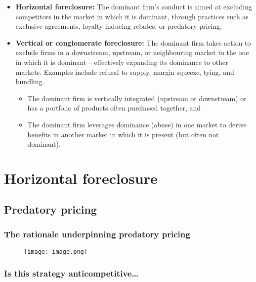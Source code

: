             \begin{itemize}
                \item \textbf{Horizontal foreclosure:} The dominant firm’s conduct is aimed at excluding competitors in the market in which it is dominant, through practices such as exclusive agreements, loyalty-inducing rebates, or predatory pricing.
                \item \textbf{Vertical or conglomerate foreclosure:} The dominant firm takes action to exclude firms in a downstream, upstream, or neighbouring market to the one in which it is dominant – effectively expanding its dominance to other markets. Examples include refusal to supply, margin squeeze, tying, and bundling.
                \begin{itemize}
                    \item The dominant firm is vertically integrated (upstream or downstream) or has a portfolio of products often purchased together, and
                    \item The dominant firm leverages dominance (abuse) in one market to derive benefits in another market in which it is present (but often not dominant).
                \end{itemize}
            \end{itemize}


\section{Horizontal foreclosure}

    \subsection{Predatory pricing}

        \subsubsection{The rationale underpinning predatory pricing}

            \begin{figure}[ht]
                \centering
                \texttt{[image: image.png]}
            \end{figure}

        \subsubsection{Is this strategy anticompetitive…}

